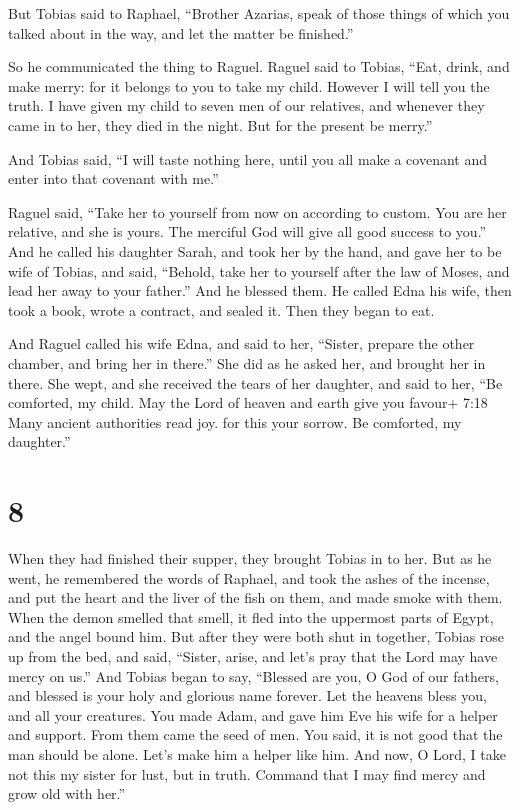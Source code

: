 But Tobias said to Raphael, ``Brother Azarias, speak of those things of
which you talked about in the way, and let the matter be finished.''

 So he communicated the thing to Raguel. Raguel said to
Tobias, ``Eat, drink, and make merry:  for it belongs to
you to take my child. However I will tell you the truth.  I
have given my child to seven men of our relatives, and whenever they
came in to her, they died in the night. But for the present be merry.''

And Tobias said, ``I will taste nothing here, until you all make a
covenant and enter into that covenant with me.''

 Raguel said, ``Take her to yourself from now on according
to custom. You are her relative, and she is yours. The merciful God will
give all good success to you.''  And he called his daughter
Sarah, and took her by the hand, and gave her to be wife of Tobias, and
said, ``Behold, take her to yourself after the law of Moses, and lead
her away to your father.'' And he blessed them.  He called
Edna his wife, then took a book, wrote a contract, and sealed it.
 Then they began to eat.

 And Raguel called his wife Edna, and said to her,
``Sister, prepare the other chamber, and bring her in there.''
 She did as he asked her, and brought her in there. She
wept, and she received the tears of her daughter, and said to her,
 ``Be comforted, my child. May the Lord of heaven and earth
give you favour+ 7:18 Many ancient authorities read joy. for this your
sorrow. Be comforted, my daughter.''

\hypertarget{section-7}{%
\section{8}\label{section-7}}

 When they had finished their supper, they brought Tobias in
to her.  But as he went, he remembered the words of Raphael,
and took the ashes of the incense, and put the heart and the liver of
the fish on them, and made smoke with them.  When the demon
smelled that smell, it fled into the uppermost parts of Egypt, and the
angel bound him.  But after they were both shut in together,
Tobias rose up from the bed, and said, ``Sister, arise, and let's pray
that the Lord may have mercy on us.''  And Tobias began to
say, ``Blessed are you, O God of our fathers, and blessed is your holy
and glorious name forever. Let the heavens bless you, and all your
creatures.  You made Adam, and gave him Eve his wife for a
helper and support. From them came the seed of men. You said, it is not
good that the man should be alone. Let's make him a helper like him.
 And now, O Lord, I take not this my sister for lust, but in
truth. Command that I may find mercy and grow old with her.''

